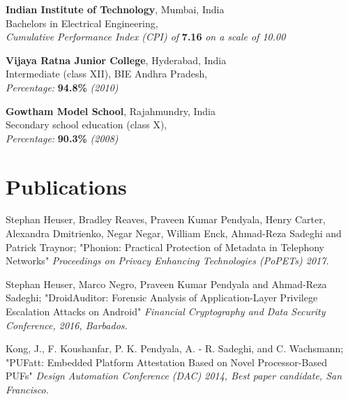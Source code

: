 \documentclass[margin,line]{resume}
\begin{document}
\begin{resume}
		{\bf Indian Institute of Technology}, Mumbai, India\\
		Bachelors in Electrical Engineering,\\
        \textit{\hspace*{2mm}Cumulative Performance Index (CPI) of} \textbf{7.16} \textit{on a scale of 10.00}
        \vspace{-2mm}
        
        {\bf Vijaya Ratna Junior College}, Hyderabad, India\\
		Intermediate (class XII), BIE Andhra Pradesh,\\
        \textit{\hspace*{2mm}Percentage:} \textbf{94.8\%} \textit{(2010)}
        \vspace{-2mm}
        
        {\bf Gowtham Model School}, Rajahmundry, India\\
		Secondary school education (class X),\\
        \textit{\hspace*{2mm}Percentage:} \textbf{90.3\%} \textit{(2008)}
        

\section{\mysidestyle Publications}
	Stephan Heuser, Bradley Reaves, Praveen Kumar Pendyala, Henry Carter, Alexandra Dmitrienko, Negar Negar, William Enck, Ahmad-Reza Sadeghi and Patrick Traynor; "Phonion: Practical Protection of Metadata in Telephony Networks"	\hfill {\textit{Proceedings on Privacy Enhancing Technologies (PoPETs) 2017.}}\\
	\vspace{-2mm}
	
    Stephan Heuser, Marco Negro, Praveen Kumar Pendyala and Ahmad-Reza Sadeghi; "DroidAuditor: Forensic Analysis of Application-Layer Privilege Escalation Attacks on Android"	\hfill {\textit{Financial Cryptography and Data Security Conference, 2016, Barbados.}}\\
	\vspace{-2mm}
	
	Kong, J., F. Koushanfar, P. K. Pendyala, A. - R. Sadeghi, and C. Wachsmann; "PUFatt: Embedded Platform Attestation Based on Novel Processor-Based PUFs"	\hfill {\textit{Design Automation Conference (DAC) 2014, Best paper candidate, San Francisco.}}\\
	\vspace{-2mm}
			

\end{resume}
\end{document}
